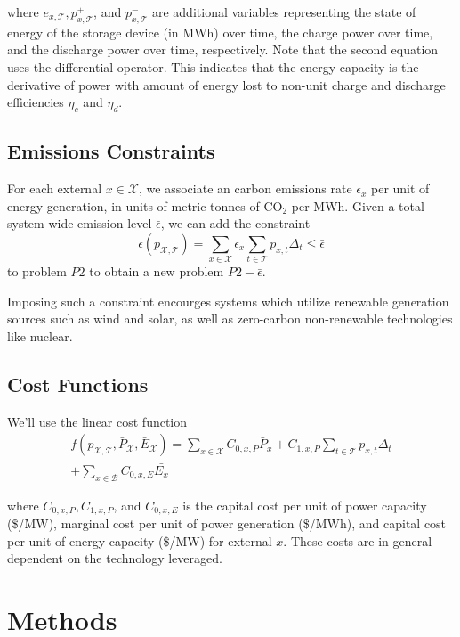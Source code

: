 \documentclass[journal,11pt]{IEEEtran}
\newcommand{\X}{\mathcal{X}}
\newcommand{\T}{\mathcal{T}}
\newcommand{\B}{\mathcal{B}}
\begin{document}
where $e_{x, \T}, p_{x, \T}^{+}$, and $p_{x, \T}^{-}$ are additional
variables representing the state of energy of the storage device (in MWh) over time,
the charge power over time, and the discharge power over time, respectively.
Note that the second equation uses the differential operator. This indicates
that the energy capacity is the derivative of power with amount of energy
lost to non-unit charge and discharge efficiencies $\eta_c$ and $\eta_d$.


\subsection{Emissions Constraints}

For each external $x\in\X$, we associate an carbon emissions rate $\epsilon_x$ per
unit of energy generation, in units of metric tonnes of CO$_2$ per MWh. Given a
total system-wide emission level $\bar{\epsilon}$, we can add the constraint
\begin{equation}
  \epsilon(p_{\X, \T}) = \sum_{x\in\X} \epsilon_x \sum_{t\in\T} p_{x, t} \Delta_t \leq \bar{\epsilon}
  \label{eq:emissions}
\end{equation}
to problem $P2$ to obtain a new problem $P2-\bar{\epsilon}$.

Imposing such a constraint encourges systems which utilize renewable generation
sources such as wind and solar, as well as zero-carbon non-renewable technologies
like nuclear.

\subsection{Cost Functions}
\label{sec:cost-funcs}
We'll use the linear cost function
\begin{align}
  f(p_{\X, \T}, \bar{P}_\X, \bar{E}_\X) = \sum_{x\in\X}
    C_{0, x, P} \bar{P}_x + C_{1, x, P} \sum_{t\in\T} {p_{x, t}} \Delta_t \\
    + \sum_{x\in\B} C_{0, x, E} \bar{E_x}
    \label{eq:cost_func}
\end{align}

where $C_{0, x, P}, C_{1, x, P}$, and $C_{0, x, E}$ is the capital cost per
unit of power capacity (\$/MW), marginal cost per unit of power generation (\$/MWh),
and capital cost per unit of energy capacity (\$/MW) for external $x$. These
costs are in general dependent on the technology leveraged.

\section{Methods}
\end{document}
